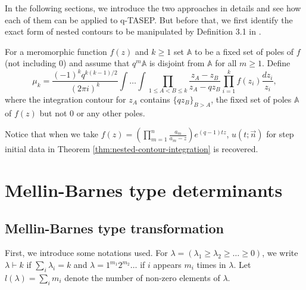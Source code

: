 In the following sections, we introduce the two approaches in details and see how each of them can be applied to q-TASEP. But before that, we first identify the exact form of nested contours to be manipulated by Definition 3.1 in \cite{macdonald2014}.

\begin{definition}
\label{mu_k_def}
For a meromorphic function $f(z)$ and $k \ge 1$ set $\mathbb{A}$ to be a fixed set of poles of $f$ (not including 0) and assume that $q^m \mathbb{A}$ is disjoint from $\mathbb{A}$ for all $m \ge 1$. Define
$$\mu_k = \frac{(-1)^k q^{k(k-1)/2}}{(2 \pi i)^k} \int \dots \int \prod_{1 \le A < B \le k} \frac{z_A - z_B} {z_A - qz_B} \prod_{i=1}^k f(z_i) \frac{dz_i}{z_i},$$ where the integration contour for $z_A$ contains $\{qz_B\}_{B > A}$, the fixed set of poles $\mathbb{A}$ of $f(z)$ but not $0$ or any other poles. 
\end{definition}

Notice that when we take $f(z) = \left( \prod_{m=1}^{n} \frac{a_m}{a_m - z} \right) e^{(q-1)tz}$, $u(t;\vec{n})$ for step initial data in Theorem \ref{thm:nested-contour-integration} is recovered.

\section{Mellin-Barnes type determinants}

\subsection{Mellin-Barnes type transformation}
\label{m-b-type-transformation}
First, we introduce some notations used. For $\lambda = (\lambda_1 \ge \lambda_2 \ge \dots \ge 0)$, we write $\lambda \vdash k$ if $\sum_i \lambda_i = k$ and $\lambda = 1^{m_1} 2^{m_2} \dots$ if $i$ appears $m_i$ times in $\lambda$. Let $l(\lambda) = \sum_i m_i$ denote the number of non-zero elements of $\lambda$.\\

